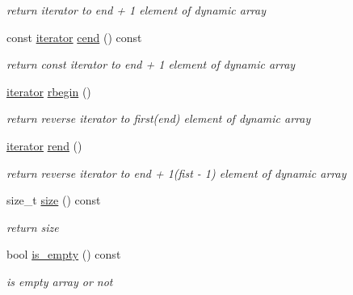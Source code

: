 \begin{DoxyCompactItemize}
\begin{DoxyCompactList}\small\item\em return iterator to end + 1 element of dynamic array \end{DoxyCompactList}\item 
\mbox{\label{classDyn__array_a1f3d9e5788e2fd180e2769c3aa0690bd}} 
const \hyperlink{classDyn__array_1_1iterator}{iterator} \hyperlink{classDyn__array_a1f3d9e5788e2fd180e2769c3aa0690bd}{cend} () const
\begin{DoxyCompactList}\small\item\em return const iterator to end + 1 element of dynamic array \end{DoxyCompactList}\item 
\mbox{\label{classDyn__array_aeed6619e4e454972c86d3c5aee2b039d}} 
\hyperlink{classDyn__array_1_1iterator}{iterator} \hyperlink{classDyn__array_aeed6619e4e454972c86d3c5aee2b039d}{rbegin} ()
\begin{DoxyCompactList}\small\item\em return reverse iterator to first(end) element of dynamic array \end{DoxyCompactList}\item 
\mbox{\label{classDyn__array_a9b89ddcbd3c2ba21ee408827f61a98eb}} 
\hyperlink{classDyn__array_1_1iterator}{iterator} \hyperlink{classDyn__array_a9b89ddcbd3c2ba21ee408827f61a98eb}{rend} ()
\begin{DoxyCompactList}\small\item\em return reverse iterator to end + 1(fist -\/ 1) element of dynamic array \end{DoxyCompactList}\item 
\mbox{\label{classDyn__array_abe033b7d651c88c537692a4ac9815355}} 
size\+\_\+t \hyperlink{classDyn__array_abe033b7d651c88c537692a4ac9815355}{size} () const
\begin{DoxyCompactList}\small\item\em return size \end{DoxyCompactList}\item 
\mbox{\label{classDyn__array_a43a702b997406bcf8426c9b2ce413693}} 
bool \hyperlink{classDyn__array_a43a702b997406bcf8426c9b2ce413693}{is\+\_\+empty} () const
\begin{DoxyCompactList}\small\item\em is empty array or not \end{DoxyCompactList}\item 

\end{DoxyCompactItemize}
